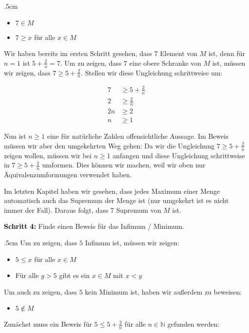 \documentclass[fontsize=9pt,
               parskip=half-,
               DIV=14,
               listof=chapterentry,
               tocflat]{scrbook}
\newenvironment{indentblock}{\begin{adjustwidth}{.5cm}{}}{\end{adjustwidth}}
\newcommand{\proofstep}[1]{\textbf{\textcolor{Black}{#1}}}
\begin{document}
\begin{solutionprocess*}
\begin{indentblock}
\begin{itemize}
\item $7\in M$
\item $7\geq x$ für alle $x\in M$
\end{itemize}

Wir haben bereits im ersten Schritt gesehen, dass $7$ Element von $M$ ist, denn für $n=1$ ist $5+{\tfrac {2}{n}}=7$. Um zu zeigen, dass $7$ eine obere Schranke von $M$ ist, müssen wir zeigen, dass $7\geq 5+{\tfrac {2}{n}}$. Stellen wir diese Ungleichung schrittweise um:

\begin{align*}
7&\geq 5+{\tfrac {2}{n}}\\2&\geq {\tfrac {2}{n}}\\2n&\geq 2\\n&\geq 1
\end{align*}

Nun ist $n\geq 1$ eine für natürliche Zahlen offensichtliche Aussage. Im Beweis müssen wir aber den umgekehrten Weg gehen: Da wir die Ungleichung $7\geq 5+{\tfrac {2}{n}}$ zeigen wollen, müssen wir bei $n\geq 1$ anfangen und diese Ungleichung schrittweise in $7\geq 5+{\tfrac {2}{n}}$ umformen. Dies können wir machen, weil wir oben nur Äquivalenzumformungen verwendet haben.

Im letzten Kapitel haben wir gesehen, dass jedes Maximum einer Menge automatisch auch das Supremum der Menge ist (nur umgekehrt ist es nicht immer der Fall). Daraus folgt, dass $7$ Supremum von $M$ ist.

\end{indentblock}

\proofstep{Schritt 4:}
 Finde einen Beweis für das Infimum / Minimum.\begin{indentblock}
Um zu zeigen, dass $5$ Infimum ist, müssen wir zeigen:

\begin{itemize}
\item $5\leq x$ für alle $x\in M$
\item Für alle $y>5$ gibt es ein $x\in M$ mit $x<y$
\end{itemize}

Um auch zu zeigen, dass $5$ kein Minimum ist, haben wir außerdem zu beweisen:

\begin{itemize}
\item $5\notin M$
\end{itemize}

Zunächst muss ein Beweis für $5\leq 5+{\tfrac {2}{n}}$ für alle $n\in \mathbb {N} $ gefunden werden:


\end{indentblock}
\end{solutionprocess*}
\end{document}
